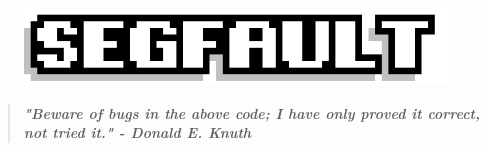 \documentclass[9pt]{extarticle} %
\begin{document}

\pagestyle{fancy}
\fancyhf{}
\rhead{\today}
\addtolength\footskip{-15px}


\begin{figure}[H]
\centering\vspace{0.5cm}\includegraphics[width=0.8\linewidth]{imgs/segfault.png}
\end{figure}


\vspace{-15px}
\begin{quote}
\centering
\textbf{\textit{"Beware of bugs in the above code; I have only proved it correct, not tried it." - Donald E. Knuth}}
\end{quote}
\vspace{10px}

\end{document}
